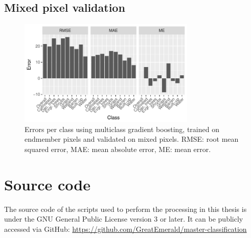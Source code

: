 \documentclass[a4paper,12pt]{scrbook}
\begin{document}
\begin{appendices}
 \section{Mixed pixel validation}
 \begin{figure}[!h]
  \centering
  \includegraphics[width=0.75\textwidth]{thesis-figures/perclass-errors-gb}
  \caption{Errors per class using multiclass gradient boosting, trained on endmember pixels and validated on mixed pixels. RMSE: root mean squared error, MAE: mean absolute error, ME: mean error.}
  \label{fig-perclass-errors-gb}
 \end{figure}
 
 \chapter{Source code}
 The source code of the scripts used to perform the processing in this thesis is under the GNU General Public License version 3 or later. It can be publicly accessed via GitHub: \url{https://github.com/GreatEmerald/master-classification}
 
\end{appendices}
\end{document}
